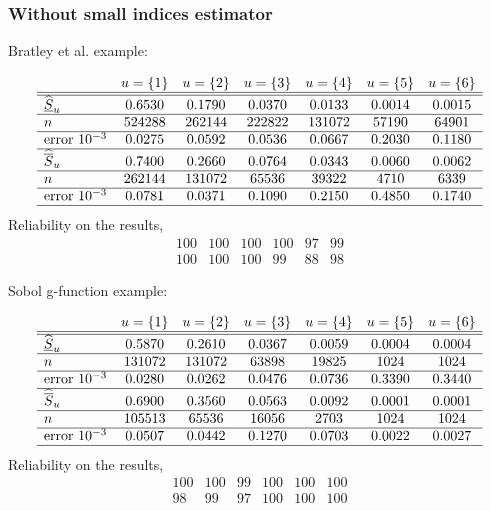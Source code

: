 \subsubsection{Without small indices estimator}
Bratley et al. example:

\[
\begin{array}{lcccccc}
   & u=\{1\} & u=\{2\} & u=\{3\} & u=\{4\} & u=\{5\} & u=\{6\} \\ \hline \hline
 \widehat{\underline{S}}_u & 0.6530 & 0.1790 & 0.0370 & 0.0133 & 0.0014 & 0.0015 \\ \hline
 n & 524288 & 262144  &  222822 & 131072 & 57190 & 64901 \\ \hline
 \text{error } 10^{-3} & 0.0275 & 0.0592 & 0.0536 & 0.0667 &  0.2030 & 0.1180 \\ \hline
 \widehat{\overline{S}}_u & 0.7400 & 0.2660 & 0.0764 & 0.0343 & 0.0060 & 0.0062 \\  \hline
 n & 262144 & 131072 &  65536 &  39322 & 4710 & 6339 \\ \hline
 \text{error } 10^{-3} & 0.0781 & 0.0371 & 0.1090 & 0.2150 &  0.4850 & 0.1740 \\ \hline
\end{array}
\]
Reliability on the results,
\[
\begin{array}{ cccccc }
     100  & 100  & 100  & 100  &  97  & 99 \\
     100  & 100  & 100  &  99  &  88  &  98
\end{array}
\]


Sobol g-function example:

\[
\begin{array}{lcccccc}
   & u=\{1\} & u=\{2\} & u=\{3\} & u=\{4\} & u=\{5\} & u=\{6\} \\ \hline \hline
 \widehat{\underline{S}}_u & 0.5870 & 0.2610 & 0.0367 &  0.0059 & 0.0004 & 0.0004 \\ \hline
 n & 131072 & 131072 & 63898 & 19825 & 1024 & 1024 \\ \hline
 \text{error } 10^{-3} & 0.0280 & 0.0262 & 0.0476 & 0.0736 & 0.3390 & 0.3440 \\ \hline
 \widehat{\overline{S}}_u & 0.6900 & 0.3560 & 0.0563 & 0.0092 & 0.0001 &  0.0001 \\  \hline
 n & 105513 & 65536 & 16056 & 2703 & 1024 & 1024 \\ \hline
 \text{error } 10^{-3} & 0.0507 & 0.0442 & 0.1270 & 0.0703 & 0.0022 & 0.0027 \\ \hline
\end{array}
\]
Reliability on the results,
\[
\begin{array}{ cccccc }
     100  & 100  & 99  & 100  &  100  & 100 \\
     98  &  99  &  97 &  100  & 100 &  100
\end{array}
\]

